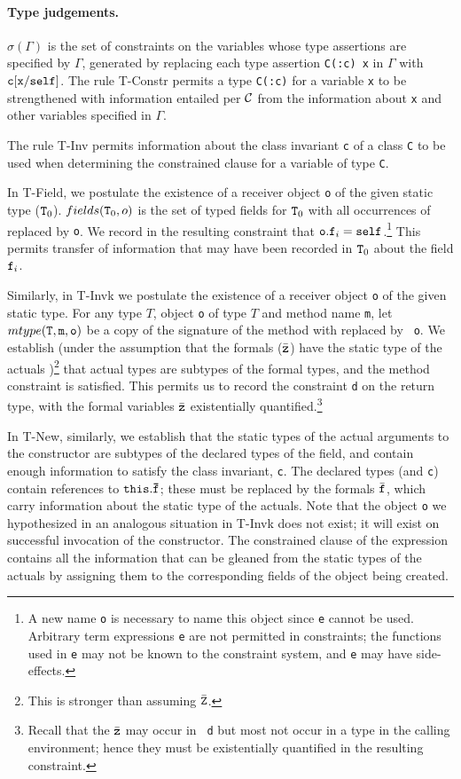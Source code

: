 \paragraph{Type judgements.}

$\sigma(\Gamma)$ is the set of constraints on the variables whose type
assertions are specified by $\Gamma$, generated by replacing each type
assertion {\tt C(:c) x} in $\Gamma$ with ${\tt c}[{\tt x}/\self]$.
The rule T-Constr permits a type {\tt C(:c)} for a variable {\tt x} to
be strengthened with information entailed per $\cal C$ from the
information about {\tt x} and other variables specified in $\Gamma$.

The rule T-Inv permits information about the class invariant {\tt c}
of a class {\tt C} to be used when determining the constrained clause
for a variable of type {\tt C}.

In T-Field, we postulate the existence of a receiver object {\tt o} of
the given static type (${\tt T}_0$). $fields({\tt T}_0,o)$ is
the set of typed fields for ${\tt T}_0$ with all occurrences of 
\this{} replaced  by {\tt o}. We record in the resulting
constraint that ${\tt o.f}_i=\self$.\footnote{A new name {\tt o} is
necessary to name this object since {\tt e} cannot be used. Arbitrary
term expressions {\tt e} are not permitted in constraints; the
functions used in {\tt e} may not be known to the constraint system,
and {\tt e} may have side-effects.}  This permits transfer of
information that may have been recorded in ${\tt T}_0$ about the field
${\tt f}_i$. 

Similarly, in T-Invk we postulate the existence of a receiver object
{\tt o} of the given static type. For any type $T$, object {\tt o} of
type $T$ and method name {\tt m}, let $mtype({\tt T},{\tt m},{\tt o})$
be a copy of the signature of the method with \this{} replaced by {\tt
o}. We establish (under the assumption that the formals ($\bar{\tt
z}$) have the static type of the actuals
)\footnote{This is stronger than assuming $\bar{\tt Z}$.}
that actual types are
subtypes of the formal types, and the method constraint is
satisfied. This permits us to record the constraint {\tt d} on the
return type, with the formal variables $\bar{\tt z}$ existentially
quantified.\footnote{Recall that the $\bar{\tt z}$ may occur in {\tt
d} but most not occur in a type in the calling environment; hence they
must be existentially quantified in the resulting constraint.}

In T-New, similarly, we establish that the static types of the actual
arguments to the constructor are subtypes of the declared types of the
field, and contain enough information to satisfy the class invariant,
{\tt c}. The declared types (and {\tt c}) contain references to ${\tt
this.\bar{\tt f}}$; these must be replaced by the formals $\bar{\tt
f}$, which carry information about the static type of the
actuals. Note that the object {\tt o} we hypothesized in an analogous
situation in T-Invk does not exist; it will exist on successful
invocation of the constructor. The constrained clause of the \new{}
expression contains all the information that can be gleaned from the
static types of the actuals by assigning them to the corresponding
fields of the object being created.


